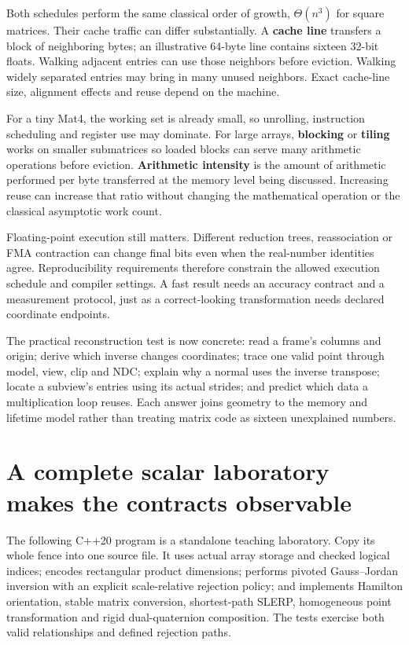 Both schedules perform the same classical order of growth, \(\Theta(n^3)\) for square matrices. Their cache traffic can differ substantially. A \textbf{cache line} transfers a block of neighboring bytes; an illustrative 64-byte line contains sixteen 32-bit floats. Walking adjacent entries can use those neighbors before eviction. Walking widely separated entries may bring in many unused neighbors. Exact cache-line size, alignment effects and reuse depend on the machine.

For a tiny Mat4, the working set is already small, so unrolling, instruction scheduling and register use may dominate. For large arrays, \textbf{blocking} or \textbf{tiling} works on smaller submatrices so loaded blocks can serve many arithmetic operations before eviction. \textbf{Arithmetic intensity} is the amount of arithmetic performed per byte transferred at the memory level being discussed. Increasing reuse can increase that ratio without changing the mathematical operation or the classical asymptotic work count.

Floating-point execution still matters. Different reduction trees, reassociation or FMA contraction can change final bits even when the real-number identities agree. Reproducibility requirements therefore constrain the allowed execution schedule and compiler settings. A fast result needs an accuracy contract and a measurement protocol, just as a correct-looking transformation needs declared coordinate endpoints.

The practical reconstruction test is now concrete: read a frame's columns and origin; derive which inverse changes coordinates; trace one valid point through model, view, clip and NDC; explain why a normal uses the inverse transpose; locate a subview's entries using its actual strides; and predict which data a multiplication loop reuses. Each answer joins geometry to the memory and lifetime model rather than treating matrix code as sixteen unexplained numbers.

\section{A complete scalar laboratory makes the contracts observable}\label{02-foundations-ii-ch038-a-complete-scalar-laboratory-makes-the-contracts-observable}

\hypertarget{02-foundations-ii-ch038-a-complete-scalar-laboratory-makes-the-contracts-observable}{}

The following C++20 program is a standalone teaching laboratory. Copy its whole fence into one source file. It uses actual array storage and checked logical indices; encodes rectangular product dimensions; performs pivoted Gauss--Jordan inversion with an explicit scale-relative rejection policy; and implements Hamilton orientation, stable matrix conversion, shortest-path SLERP, homogeneous point transformation and rigid dual-quaternion composition. The tests exercise both valid relationships and defined rejection paths.

